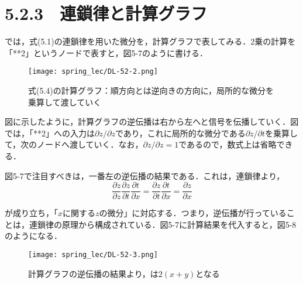 \documentclass[dvipdfmx]{jsarticle}
\begin{document}
\section*{5.2.3　連鎖律と計算グラフ}
では，式(5.1)の連鎖律を用いた微分を，計算グラフで表してみる．2乗の計算を「**2」というノードで表すと，図5-7のように書ける．

\begin{figure}[htbp]
    \begin{center}
    \texttt{[image: spring\_lec/DL-52-2.png]}
    \end{center}
    \caption{式(5.4)の計算グラフ：順方向とは逆向きの方向に，局所的な微分を乗算して渡していく}
\end{figure}

図に示したように，計算グラフの逆伝播は右から左へと信号を伝播していく．図では，「**2」への入力は$\partial z / \partial z$であり，これに局所的な微分である$\partial z / \partial t$を乗算して，次のノードへ渡していく．なお，$\partial z/ \partial z = 1$であるので，数式上は省略できる．

図5-7で注目すべきは，一番左の逆伝播の結果である．これは，連鎖律より，
\begin{equation*}\label{}
\frac{\partial z}{\partial z} \frac{\partial z}{\partial t} \frac{\partial t}{\partial x} = \frac{\partial z}{\partial t} \frac{\partial t}{\partial x} = \frac{\partial z}{\partial x}
\end{equation*}

\noindent
が成り立ち，「$xに関するzの微分$」に対応する．つまり，逆伝播が行っていることは，連鎖律の原理から構成されている．図5-7に計算結果を代入すると，図5-8のようになる．
\begin{figure}[htbp]
    \begin{center}
    \texttt{[image: spring\_lec/DL-52-3.png]}
    \end{center}
    \caption{計算グラフの逆伝播の結果より，は$2(x+y)$となる}
\end{figure}
\end{document}
